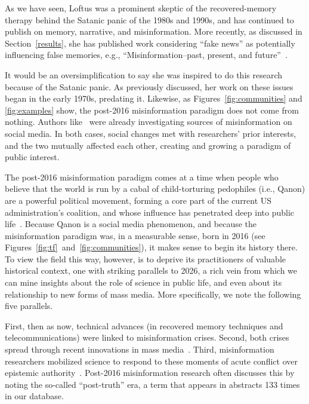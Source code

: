 \documentclass[          
 pre,
 twocolumn,
 twoside,
 superscriptaddress,
 amsmath,
 amssymb,                
 apsf
]{revtex4-2}
\begin{document}
As we have seen, Loftus was a prominent skeptic of the recovered-memory therapy behind the Satanic panic of the 1980s and 1990s, and has continued to publish on memory, narrative, and misinformation. More recently, as discussed in Section~\ref{results},
she has published work considering ``fake news'' as potentially influencing false memories, e.g., ``Misinformation–past, present, and future''~\cite{loftus_misinformation_2024}.

It would be an oversimplification to say she was inspired to do this research because of the Satanic panic. As previously discussed, her work on these issues began in the early 1970s, predating it. Likewise, as Figures~\ref{fig:communities} and \ref{fig:examples} show, the post-2016 misinformation paradigm does not come from nothing. Authors like~\citet{nguyen_sources_2012} were already investigating sources of misinformation on social media. In both cases, social changes met with researchers' prior interests, and the two mutually affected each other, creating and growing a paradigm of public interest. 

The post-2016 misinformation paradigm comes at a time when people who believe that the world is run by a cabal of child-torturing pedophiles (i.e., Qanon) are a powerful political movement, forming a core part of the current US administration's coalition, and whose influence has penetrated deep into public life~\cite{feeld_qanon_2025}. Because Qanon is a social media phenomenon, and because the misinformation paradigm was, in a measurable sense, born in 2016 (see Figures~\ref{fig:tf}~and~\ref{fig:communities}), it makes sense to begin its history there. To view the field this way, however, is to deprive its practitioners of valuable historical context, one with striking parallels to 2026, a rich vein from which we can mine insights about the role of science in public life, and even about its relationship to new forms of mass media. More specifically, we note the following five parallels. 

First, then as now, technical advances (in recovered memory techniques and telecommunications) were linked to misinformation crises. Second, both crises spread through recent innovations in mass media~\cite{hearst_qanon_2022}. Third, misinformation researchers mobilized science to respond to these moments of acute conflict over epistemic authority~\cite{Zagzebski2012}. Post-2016 misinformation research often discusses this by noting the so-called ``post-truth'' era, a term that appears in abstracts 133 times in our database.
  
\end{document}
